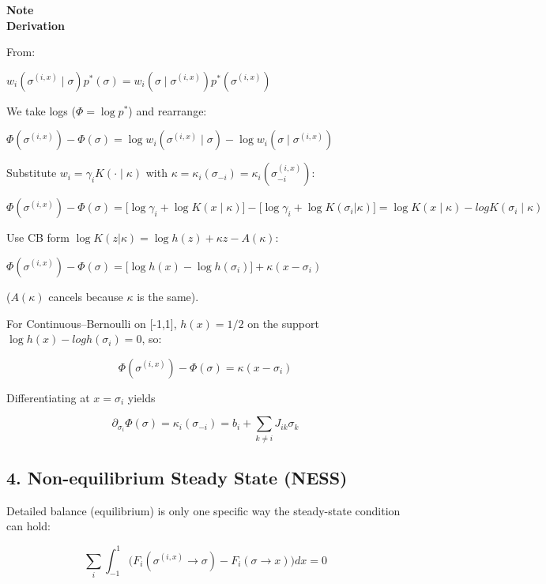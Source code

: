 \documentclass{article}
\begin{document}
\begin{framed}
\textbf{Note}\\
\textbf{Derivation}

From:

$w_i(\sigma^{(i,x)}\mid\sigma) p^\ast(\sigma) = w_i(\sigma\mid\sigma^{(i,x)}) p^\ast(\sigma^{(i,x)})$

We take logs ($\Phi=\log p^\ast$) and rearrange:

$\Phi(\sigma^{(i,x)}) - \Phi(\sigma) = \log w_i(\sigma^{(i,x)} \mid \sigma) - \log w_i(\sigma \mid \sigma^{(i,x)})$

Substitute $w_i = \gamma_i K(\cdot \mid \kappa)$ with $\kappa = \kappa_i(\sigma_{ -i}) = \kappa_i(\sigma^{(i,x)}_{ -i})$:

$\Phi(\sigma^{(i,x)}) - \Phi(\sigma) = \big[\log \gamma_i + \log K(x \mid \kappa)\big] - \big[\log \gamma_i + \log K(\sigma_i|\kappa)\big] = \log K(x \mid \kappa) - log K(\sigma_i \mid \kappa)$

Use CB form $\log K(z|\kappa) = \log h(z) + \kappa z - A(\kappa)$:

$\Phi(\sigma^{(i,x)}) - \Phi(\sigma) = \big[ \log h(x) - \log h(\sigma_i)\big] + \kappa(x - \sigma_i)$

($A(\kappa)$ cancels because $\kappa$ is the same).

For Continuous--Bernoulli on [-1,1], $h(x) = 1/2$ on the support \Rightarrow $\log h(x) - log h(\sigma_i) = 0$, so:

\begin{equation}
\Phi(\sigma^{(i,x)}) − \Phi(σ) = \kappa(x − \sigma_i)
\end{equation}

Differentiating at $x=\sigma_i$ yields

\begin{equation}
\partial_{\sigma_i}\Phi(\sigma) = \kappa_i(\sigma_{-i}) = b_i + \sum_{k\neq i} J_{ik} \sigma_k
\end{equation}
\end{framed}

\subsection{4. Non-equilibrium Steady State (NESS)}

Detailed balance (equilibrium) is only one specific way the steady-state condition can hold:

\begin{equation}
\sum_i \int_{-1}^1 \Big(F_i(\sigma^{(i,x)}\to\sigma)-F_i(\sigma\to x)\Big) dx = 0
\end{equation}
\end{document}
